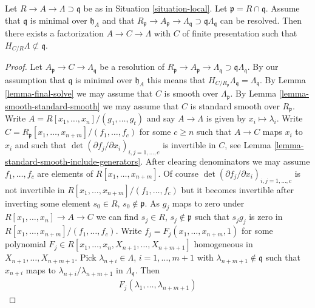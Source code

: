 \begin{lemma}
\label{lemma-delocalize-weak}
Let $R \to A \to \Lambda \supset \mathfrak q$ be as in
Situation \ref{situation-local}. Let $\mathfrak p = R \cap \mathfrak q$.
Assume that $\mathfrak q$ is minimal over $\mathfrak h_A$ and that
$R_\mathfrak p \to A_\mathfrak p \to \Lambda_\mathfrak q
\supset \mathfrak q\Lambda_\mathfrak q$ can be resolved.
Then there exists a factorization $A \to C \to \Lambda$ with $C$ of
finite presentation such that $H_{C/R} \Lambda \not \subset \mathfrak q$.
\end{lemma}

\begin{proof}
Let $A_\mathfrak p \to C \to \Lambda_\mathfrak q$ be a resolution of
$R_\mathfrak p \to A_\mathfrak p \to \Lambda_\mathfrak q
\supset \mathfrak q\Lambda_\mathfrak q$. By our assumption
that $\mathfrak q$ is minimal over $\mathfrak h_A$ this
means that $H_{C/R_\mathfrak p} \Lambda_\mathfrak q = \Lambda_\mathfrak q$.
By Lemma \ref{lemma-final-solve}
we may assume that $C$ is smooth over $\Lambda_\mathfrak p$.
By Lemma \ref{lemma-smooth-standard-smooth} we may assume that
$C$ is standard smooth over $R_\mathfrak p$.
Write $A = R[x_1, \ldots, x_n]/(g_1, \ldots, g_t)$ and say
$A \to \Lambda$ is given by $x_i \mapsto \lambda_i$.
Write $C = R_\mathfrak p[x_1, \ldots, x_{n + m}]/(f_1, \ldots, f_c)$
for some $c \geq n$ such that $A \to C$ maps $x_i$ to $x_i$ and such that
$\det(\partial f_j/\partial x_i)_{i, j = 1, \ldots, c}$
is invertible in $C$, see
Lemma \ref{lemma-standard-smooth-include-generators}.
After clearing denominators we may assume
$f_1, \ldots, f_c$ are elements of $R[x_1, \ldots, x_{n + m}]$.
Of course
$\det(\partial f_j/\partial x_i)_{i, j = 1, \ldots, c}$
is not invertible in $R[x_1, \ldots, x_{n + m}]/(f_1, \ldots, f_c)$
but it becomes invertible after inverting some element $s_0 \in R$,
$s_0 \not \in \mathfrak p$.
As $g_j$ maps to zero under $R[x_1, \ldots, x_n] \to A \to C$
we can find $s_j \in R$, $s_j \not \in \mathfrak p$ such that
$s_j g_j$ is zero in $R[x_1, \ldots, x_{n + m}]/(f_1, \ldots, f_c)$.
Write $f_j = F_j(x_1, \ldots, x_{n + m}, 1)$
for some polynomial
$F_j \in R[x_1, \ldots, x_n, X_{n + 1}, \ldots, X_{n + m + 1}]$
homogeneous in $X_{n + 1}, \ldots, X_{n + m + 1}$.
Pick $\lambda_{n + i} \in \Lambda$, $i = 1, \ldots, m + 1$ with
$\lambda_{n + m + 1} \not \in \mathfrak q$ such that $x_{n + i}$ maps to
$\lambda_{n + i}/\lambda_{n + m + 1}$ in $\Lambda_\mathfrak q$.
Then
\begin{align*}
F_j(\lambda_1, \ldots, \lambda_{n + m + 1})

\end{align*}
\end{proof}
